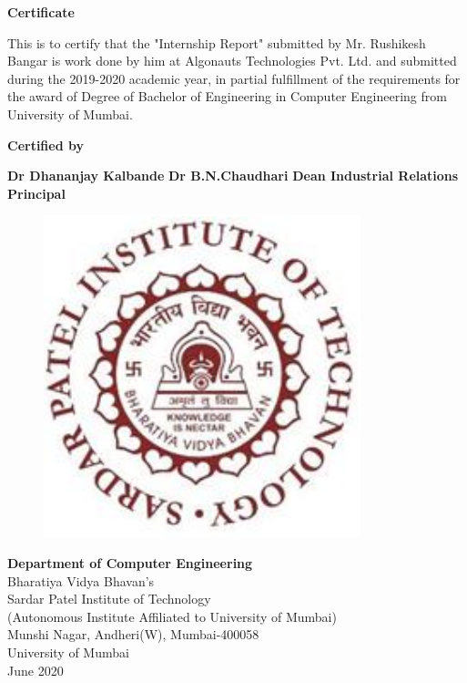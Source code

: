 \thispagestyle{empty}
\vspace*{0.2cm}
\vspace{1cm}
\begin{center}
\large\textbf{Certificate}
\end{center}
\vspace{1cm}
This is to certify that the "Internship Report" submitted by Mr. Rushikesh Bangar is work done by him at Algonauts Technologies Pvt. Ltd. and submitted during the 2019-2020 academic year, in partial fulfillment of the requirements for the award of Degree of Bachelor of Engineering in Computer Engineering from University of Mumbai.\\
\vspace{1cm}
\begin{center}
\textbf{Certified by}
\end{center}
\vspace{1cm}
\vspace{1cm}

\textbf {Dr Dhananjay Kalbande} \hspace{2.4in} \textbf {Dr B.N.Chaudhari}
\newline
\hspace*{0.5cm}
\textbf {Dean Industrial Relations} \hspace{2.2in}
\textbf{Principal} \\
\vspace{1cm}

 
\begin{figure}[h]
\centering
\includegraphics[scale=0.8]{spitlogo.pdf}

\end{figure}
\hspace{.05cm}
\hspace{.05cm}
 
\begin{center}
\textbf {Department of Computer Engineering}\\
Bharatiya  Vidya Bhavan's\\
Sardar Patel Institute of Technology\\
(Autonomous Institute Affiliated to University of Mumbai)\\
Munshi Nagar, Andheri(W), Mumbai-400058\\
University of Mumbai\\
June 2020\\
\end{center}

